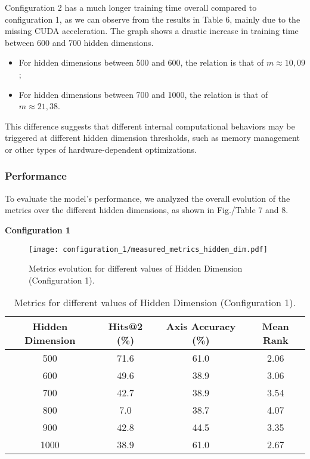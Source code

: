Configuration 2 has a much longer training time overall compared to configuration 1, as we can observe from the results in Table 6, mainly due to the missing CUDA acceleration. The graph shows a drastic increase in training time between 600 and 700 hidden dimensions. \par
\begin{itemize}
\item For hidden dimensions between 500 and 600, the relation is that of $m \approx 10,09$;
\item For hidden dimensions between 700 and 1000, the relation is that of $m \approx 21,38$. 
\end{itemize}
This difference suggests that different internal computational behaviors may be triggered at different hidden dimension thresholds, such as memory management or other types of hardware-dependent optimizations. 

\subsubsection{Performance}
To evaluate the model's performance, we analyzed the overall evolution of the metrics over the different hidden dimensions, as shown in Fig./Table 7 and 8.

\vspace{0.3cm}
\textbf{Configuration 1}
\begin{figure}[H]
    \centering
    \texttt{[image: configuration\_1/measured\_metrics\_hidden\_dim.pdf]}
    \caption{Metrics evolution for different values of Hidden Dimension (Configuration 1).}  
    \label{fig:metrics_hidden_dim_c1}               
\end{figure}


\begin{table}[h]
\centering
\caption{Metrics for different values of Hidden Dimension (Configuration 1).}
\begin{tabular}{|c|c|c|c|}
\hline
Hidden Dimension & Hits@2 (\%) & Axis Accuracy (\%) & Mean Rank \\
\hline
500  & 71.6 & 61.0 & 2.06\\
600  & 49.6 & 38.9 & 3.06\\
700  & 42.7 & 38.9 & 3.54\\
800  & 7.0 & 38.7 & 4.07\\
900  & 42.8 & 44.5 & 3.35\\
1000  & 38.9 & 61.0  & 2.67\\
\hline
\end{tabular}
\label{tab:metrics_hidden_dim_table_c1}
\end{table}

